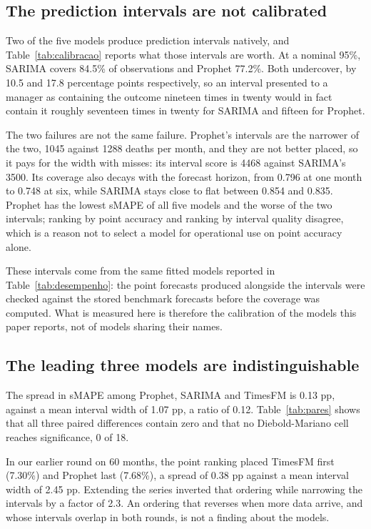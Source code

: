 \subsection{The prediction intervals are not calibrated}



Two of the five models produce prediction intervals natively, and Table~\ref{tab:calibracao}
reports what those intervals are worth. At a nominal 95\%, SARIMA covers 84.5\% of
observations and Prophet 77.2\%. Both undercover, by 10.5 and 17.8 percentage points
respectively, so an interval presented to a manager as containing the outcome nineteen times
in twenty would in fact contain it roughly seventeen times in twenty for SARIMA and fifteen
for Prophet.

The two failures are not the same failure. Prophet's intervals are the narrower of the two,
1045 against 1288 deaths per month, and they are not better placed, so it pays for the width
with misses: its interval score is 4468 against SARIMA's 3500. Its coverage also decays with
the forecast horizon, from 0.796 at one month to 0.748 at six, while SARIMA stays close to
flat between 0.854 and 0.835. Prophet has the lowest sMAPE of all five models and the worse
of the two intervals; ranking by point accuracy and ranking by interval quality disagree,
which is a reason not to select a model for operational use on point accuracy alone.

These intervals come from the same fitted models reported in
Table~\ref{tab:desempenho}: the point forecasts produced alongside the intervals were checked
against the stored benchmark forecasts before the coverage was computed. What is measured
here is therefore the calibration of the models this paper reports, not of models sharing
their names.

\subsection{The leading three models are indistinguishable}

The spread in sMAPE among Prophet, SARIMA and TimesFM is 0.13 pp, against a mean interval
width of 1.07 pp, a ratio of 0.12. Table~\ref{tab:pares} shows that all three paired
differences contain zero and that no Diebold-Mariano cell reaches significance, 0 of 18.



In our earlier round on 60 months, the point ranking placed TimesFM first (7.30\%) and
Prophet last (7.68\%), a spread of 0.38 pp against a mean interval width of 2.45 pp.
Extending the series inverted that ordering while narrowing the intervals by a factor of
2.3. An ordering that reverses when more data arrive, and whose intervals overlap in both
rounds, is not a finding about the models.

